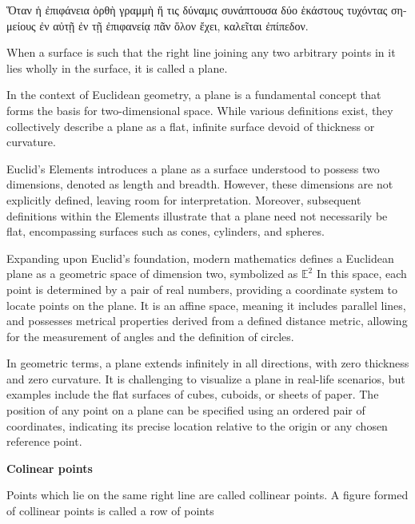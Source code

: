 
\begin{defin}
\textgreek{Ὅταν ἡ ἐπιφάνεια ὀρθὴ γραμμὴ ἥ τις δύναμις συνάπτουσα δύο ἑκάστους τυχόντας σημείους ἐν αὐτῇ ἐν τῇ ἐπιφανείᾳ πᾶν ὅλον ἔχει, καλεῖται ἐπίπεδον.}

When a surface is such that the right line joining any two arbitrary points in it lies wholly in the surface, it is called a plane.
\end{defin}

In the context of Euclidean geometry, a plane is a fundamental concept that forms the basis for two-dimensional space. While various definitions exist, they collectively describe a plane as a flat, infinite surface devoid of thickness or curvature.

Euclid's Elements introduces a plane as a surface understood to possess two dimensions, denoted as length and breadth. However, these dimensions are not explicitly defined, leaving room for interpretation. Moreover, subsequent definitions within the Elements illustrate that a plane need not necessarily be flat, encompassing surfaces such as cones, cylinders, and spheres.

Expanding upon Euclid's foundation, modern mathematics defines a Euclidean plane as a geometric space of dimension two, symbolized as $\mathbb{E}^{2}$  In this space, each point is determined by a pair of real numbers, providing a coordinate system to locate points on the plane. It is an affine space, meaning it includes parallel lines, and possesses metrical properties derived from a defined distance metric, allowing for the measurement of angles and the definition of circles.

In geometric terms, a plane extends infinitely in all directions, with zero thickness and zero curvature. It is challenging to visualize a plane in real-life scenarios, but examples include the flat surfaces of cubes, cuboids, or sheets of paper. The position of any point on a plane can be specified using an ordered pair of coordinates, indicating its precise location relative to the origin or any chosen reference point.

\clearpage

\textbf{Colinear points}

Points which lie on the same right line are called collinear points. A figure formed of collinear points is called a row of points

